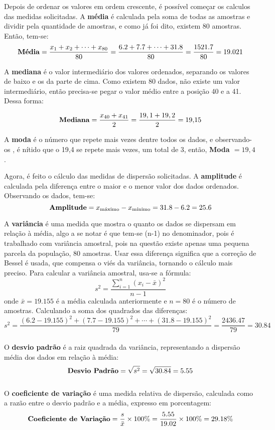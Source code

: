 \documentclass[a4paper,11pt]{article}
\begin{document}
Depois de ordenar os valores em ordem crescente, é possível começar os calculos das medidas solicitadas. A \textbf{média} é calculada pela soma de todas as amostras e dividir pela quantidade de amostras, e como já foi dito, existem 80 amostras. Então, tem-se:
\[
\text{\textbf{Média}} = \frac{x_1 + x_2 + \cdots + x_{80}}{80} =  \frac{6.2 + 7.7 + \cdots + 31.8}{80} =  \frac{1521.7}{80} = 19.021
\]

A \textbf{mediana} é o valor intermediário dos valores ordenados, separando os valores de baixo e os da parte de cima. Como existem 80 dados, não existe um valor intermediário, então precisa-se pegar o valor médio entre a posição 40 e a 41. Dessa forma:

\[
\text{\textbf{Mediana}} = \frac{x_{40} + x_{41}}{2} = \frac{19,1 + 19,2}{2} = 19{,}15
\] 

A \textbf{moda} é o número que repete mais vezes dentre todos os dados, e observando-os , é nítido que o 19,4 se repete mais vezes, um total de 3, então, \textbf{Moda $= 19,4$}.

Agora, é feito o cálculo das medidas de dispersão solicitadas. A \textbf{amplitude} é calculada pela diferença entre o maior e o menor valor dos dados ordenados. Observando os dados, tem-se:
\[
\text{\textbf{Amplitude}} = x_{\text{máximo}} - x_{\text{mínimo}} = 31.8 - 6.2 = 25.6
\]

A \textbf{variância} é uma medida que mostra o quanto os dados se dispersam em relação à média, algo a se notar é que tem-se (n-1) no denominador, pois é trabalhado com variância amostral, pois na questão existe apenas uma pequena parcela da população, 80 amostras. Usar essa diferença significa que a correção de Bessel é usada, que compensa o viés da variância, tornando o cálculo mais preciso. Para calcular a variância amostral, usa-se a fórmula:
\[
s^2 = \frac{\sum_{i=1}^{n} (x_i - \bar{x})^2}{n-1}
\]
onde $\bar{x} = 19.155$ é a média calculada anteriormente e $n = 80$ é o número de amostras. Calculando a soma dos quadrados das diferenças:
\[
s^2 = \frac{(6.2-19.155)^2 + (7.7-19.155)^2 + \cdots + (31.8-19.155)^2}{79} = \frac{2436.47}{79} = 30.84
\]
\\

O \textbf{desvio padrão} é a raiz quadrada da variância, representando a dispersão média dos dados em relação à média:
\[
\text{\textbf{Desvio Padrão}} = \sqrt{s^2} = \sqrt{30.84} = 5.55
\]
\\

O \textbf{coeficiente de variação} é uma medida relativa de dispersão, calculada como a razão entre o desvio padrão e a média, expresso em porcentagem:
\[
\text{\textbf{Coeficiente de Variação}} = \frac{s}{\bar{x}} \times 100\% = \frac{5.55}{19.02} \times 100\% = 29.18\%
\]
\\
\end{document}

